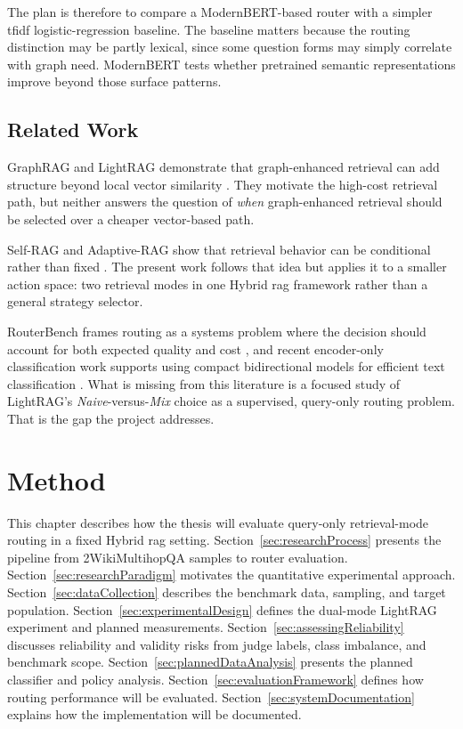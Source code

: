 \documentclass[english, bibtex]{kththesis}               %
\numberwithin{listing}{chapter}
\begin{document}
The plan is therefore to compare a ModernBERT-based router with a simpler \gls{tfidf} logistic-regression baseline. The baseline matters because the routing distinction may be partly lexical, since some question forms may simply correlate with graph need. ModernBERT tests whether pretrained semantic representations improve beyond those surface patterns.

\section{Related Work}
\label{sec:relatedWork}

GraphRAG and LightRAG demonstrate that graph-enhanced retrieval can add structure beyond local vector similarity \cite{edge2024graphrag,lightrag2024}. They motivate the high-cost retrieval path, but neither answers the question of \emph{when} graph-enhanced retrieval should be selected over a cheaper vector-based path.

Self-RAG and Adaptive-RAG show that retrieval behavior can be conditional rather than fixed \cite{asai2023selfrag,jeong2024adaptiverag}. The present work follows that idea but applies it to a smaller action space: two retrieval modes in one Hybrid \gls{rag} framework rather than a general strategy selector.

RouterBench frames routing as a systems problem where the decision should account for both expected quality and cost \cite{hu2024routerbench}, and recent encoder-only classification work supports using compact bidirectional models for efficient text classification \cite{devlin2019bert,benayas2024encoder,warner2024modernbert}. What is missing from this literature is a focused study of LightRAG's \emph{Naive}-versus-\emph{Mix} choice as a supervised, query-only routing problem. That is the gap the project addresses.

\cleardoublepage
\chapter{Method}
\label{ch:methods}
This chapter describes how the thesis will evaluate query-only retrieval-mode routing in a fixed Hybrid \gls{rag} setting. Section~\ref{sec:researchProcess} presents the pipeline from 2WikiMultihopQA samples to router evaluation. Section~\ref{sec:researchParadigm} motivates the quantitative experimental approach. Section~\ref{sec:dataCollection} describes the benchmark data, sampling, and target population. Section~\ref{sec:experimentalDesign} defines the dual-mode LightRAG experiment and planned measurements. Section~\ref{sec:assessingReliability} discusses reliability and validity risks from judge labels, class imbalance, and benchmark scope. Section~\ref{sec:plannedDataAnalysis} presents the planned classifier and policy analysis. Section~\ref{sec:evaluationFramework} defines how routing performance will be evaluated. Section~\ref{sec:systemDocumentation} explains how the implementation will be documented.
\end{document}

